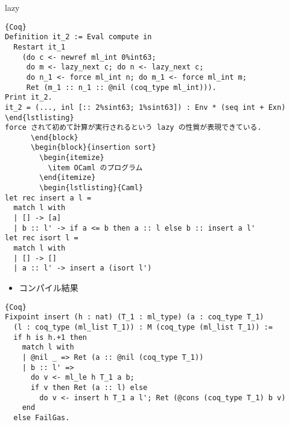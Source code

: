 \documentclass[unicode,mathserif]{beamer}
\begin{document}
\begin{frame}[fragile]
\begin{columns}[T]
\begin{column}{0.33\columnwidth}
\begin{block}{lazy}
\begin{lstlisting}{Coq}
Definition it_2 := Eval compute in
  Restart it_1
    (do c <- newref ml_int 0%int63;
     do m <- lazy_next c; do n <- lazy_next c;
     do n_1 <- force ml_int n; do m_1 <- force ml_int m;
     Ret (m_1 :: n_1 :: @nil (coq_type ml_int))). 
Print it_2.
it_2 = (..., inl [:: 2%sint63; 1%sint63]) : Env * (seq int + Exn)  \end{lstlisting}
force されて初めて計算が実行されるという lazy の性質が表現できている. 
      \end{block}
      \begin{block}{insertion sort}
        \begin{itemize}
          \item OCaml のプログラム
        \end{itemize}
        \begin{lstlisting}{Caml}
let rec insert a l =
  match l with
  | [] -> [a]
  | b :: l' -> if a <= b then a :: l else b :: insert a l'
let rec isort l =
  match l with 
  | [] -> []
  | a :: l' -> insert a (isort l')  \end{lstlisting}
        \begin{itemize}
          \item コンパイル結果
        \end{itemize}
        \begin{lstlisting}{Coq}
Fixpoint insert (h : nat) (T_1 : ml_type) (a : coq_type T_1)
  (l : coq_type (ml_list T_1)) : M (coq_type (ml_list T_1)) :=
  if h is h.+1 then
    match l with
    | @nil _ => Ret (a :: @nil (coq_type T_1))
    | b :: l' =>
      do v <- ml_le h T_1 a b;
      if v then Ret (a :: l) else
        do v <- insert h T_1 a l'; Ret (@cons (coq_type T_1) b v)
    end
  else FailGas.  \end{lstlisting}
      \end{block}
    \end{column}


\end{columns}
\end{frame}
\end{document}
